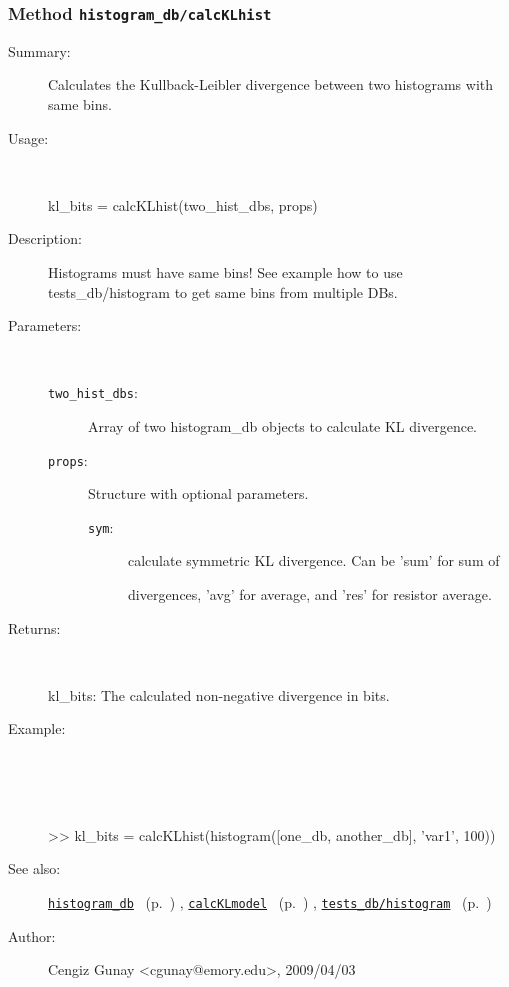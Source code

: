 \subsubsection[Method \texttt{calcKLhist}]{Method \texttt{histogram\_db/calcKLhist}}%
%
\label{ref_histogram_db__calcKLhist}%
\hypertarget{ref_histogram_db__calcKLhist}{}%
\begin{description}
\item[Summary:]Calculates the Kullback-Leibler divergence between two histograms with same bins.
%
\item[Usage:]~%
\begin{lyxcode}%
kl\_bits = calcKLhist(two\_hist\_dbs, props)
%
\end{lyxcode}%
%
\item[Description:]%
Histograms must have same bins! See example how to use
 tests\_db/histogram to get same bins from multiple DBs.
\item[Parameters:]~
\begin{description}%
\item[\texttt{two\_hist\_dbs}:]
 Array of two histogram\_db objects to calculate KL divergence.
\item[\texttt{props}:]
 Structure with optional parameters.
\begin{description}%
\item[\texttt{sym}:]
 calculate symmetric KL divergence. Can be 'sum' for sum of

divergences, 'avg' for  average, and 'res' for resistor average.
\end{description}%
\end{description}%
%
\item[Returns:
]~

   kl\_bits: The calculated non-negative divergence in bits.
%
\item[Example:]~
\begin{lyxcode} %
\\%
\\%
 >> kl\_bits = calcKLhist(histogram([one\_db, another\_db], 'var1', 100))
\\%
\end{lyxcode}
%
\item[See also:]%
\hyperlink{ref_histogram_db}{\texttt{histogram\_db}}%
\ (p.~\pageref{ref_histogram_db})%
%
, \hyperlink{ref_calcKLmodel}{\texttt{calcKLmodel}}%
\ (p.~\pageref{ref_calcKLmodel})%
%
, \hyperlink{ref_tests_db__histogram}{\texttt{tests\_db/histogram}}%
\ (p.~\pageref{ref_tests_db__histogram})%
%
%
\item[Author:]%
Cengiz Gunay <cgunay@emory.edu>, 2009/04/03
%
\end{description}
\methodline%
